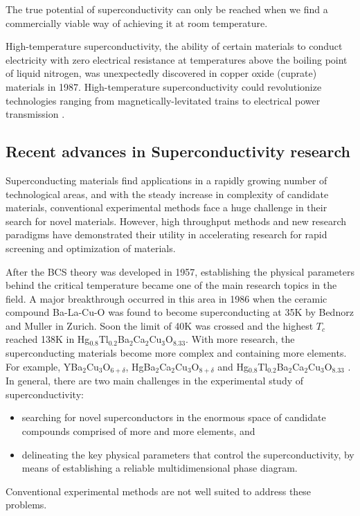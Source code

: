 \documentclass{article}
\begin{document}
The true potential of superconductivity can only be reached when we find a commercially viable way of achieving it at room temperature. 

High-temperature superconductivity, the ability of certain materials to conduct electricity with zero electrical resistance at temperatures above the boiling point of liquid nitrogen, was unexpectedly discovered in copper oxide (cuprate) materials in 1987. High-temperature superconductivity could revolutionize technologies ranging from magnetically-levitated trains to electrical power transmission \cite{hightempsuper} \cite{twentyfiveyears}
\cite{paramagnetism}. 


\subsection{Recent advances in Superconductivity research}
Superconducting materials find applications in a rapidly growing number of technological areas, and with the steady increase in complexity of candidate materials, conventional experimental methods face a huge challenge in their search for novel materials. However, high throughput methods and new research paradigms have demonstrated their utility in accelerating research for rapid screening and optimization of materials. \cite{recentadvancessuper}

After the BCS theory was developed in 1957, establishing the physical parameters behind the critical temperature became one of the main research topics in the field. A major breakthrough occurred in this area in 1986 when the ceramic compound Ba-La-Cu-O was found to become superconducting at 35K by Bednorz and Muller in Zurich. Soon the limit of 40K was crossed and the highest $T_{c}$ reached 138K in Hg$_{0.8}$Tl$_{0.2}$Ba$_{2}$Ca$_{2}$Cu$_{3}$O$_{8.33}$. With more research, the superconducting materials become more complex and containing more elements. For example, YBa$_{2}$Cu$_{3}$O$_{6+\delta}$, HgBa$_{2}$Ca$_{2}$Cu$_{3}$O$_{8+\delta}$ and Hg$_{0.8}$Tl$_{0.2}$Ba$_{2}$Ca$_{2}$Cu$_{3}$O$_{8.33}$ \cite{recentadvancessuper}.\\
In general, there are two main challenges in the experimental study of superconductivity: 
\begin{itemize}
    \item searching for novel superconductors in the enormous space of candidate compounds comprised of more and more elements, and
    \item delineating the key physical parameters that control the superconductivity, by means of establishing a reliable multidimensional phase diagram.
\end{itemize}
Conventional experimental methods are not well suited to address these problems. 
\end{document}
